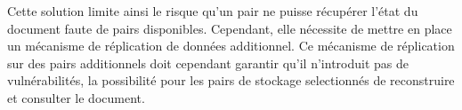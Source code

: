 \begin{itemize}
        Cette solution limite ainsi le risque qu'un pair ne puisse récupérer l'état du document faute de pairs disponibles.
        Cependant, elle nécessite de mettre en place un mécanisme de réplication de données additionnel.
        Ce mécanisme de réplication sur des pairs additionnels doit cependant garantir qu'il n'introduit pas de vulnérabilités, \eg la possibilité pour les pairs de stockage selectionnés de reconstruire et consulter le document.
\end{itemize}
